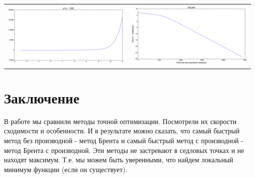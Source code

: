 \documentclass[12pt, a4paper]{article}
\begin{document}
\begin{center}
\begin{tabular}{c c}
                \includegraphics[width=\picwidth]{spec_sec_der.png} &
                \includegraphics[width=\picwidth]{spec_sec_r.png} \\
            \end{tabular}
        \end{center}



    \section{Заключение}
        В работе мы сравнили методы точной оптимизации. Посмотрели их скорости сходимости и особенности. И в результате можно сказать, что самый быстрый метод без производной - метод Брента и самый быстрый метод с производной - метод Брента с производной. Эти методы не застревают в седловых точках и не находят максимум. Т.е. мы можем быть уверенными, что найдем локальный минимум функции (если он существует).
\end{document}
